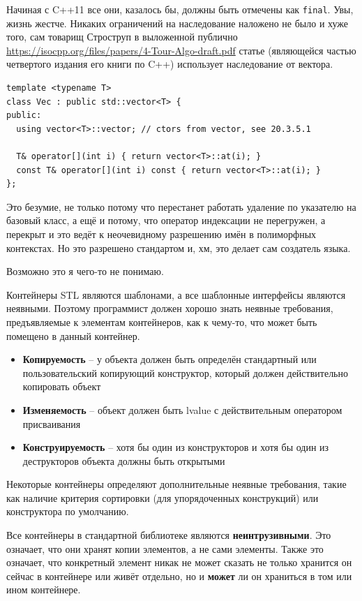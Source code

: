 \documentclass[a4paper,12pt,oneside]{book}
\begin{document}
Начиная с C++11 все они, казалось бы, должны быть отмечены как \lstinline!final!. Увы, жизнь жестче. Никаких ограничений на наследование наложено не было и хуже того, сам товарищ Строструп в выложенной публично \url{https://isocpp.org/files/papers/4-Tour-Algo-draft.pdf} статье (являющейся частью четвертого издания его книги по C++) использует наследование от вектора.

\begin{lstlisting}
template <typename T>
class Vec : public std::vector<T> {
public:
  using vector<T>::vector; // ctors from vector, see 20.3.5.1

  T& operator[](int i) { return vector<T>::at(i); }
  const T& operator[](int i) const { return vector<T>::at(i); }
};
\end{lstlisting}

Это безумие, не только потому что перестанет работать удаление по указателю на базовый класс, а ещё и потому, что оператор индексации не перегружен, а перекрыт и это ведёт к неочевидному разрешению имён в полиморфных контекстах. Но это разрешено стандартом и, хм, это делает сам создатель языка.

Возможно это я чего-то не понимаю.

Контейнеры STL являются шаблонами, а все шаблонные интерфейсы являются неявными. Поэтому программист должен хорошо знать неявные требования, предъявляемые к элементам контейнеров, как к чему-то, что может быть помещено в данный контейнер.

\begin{itemize}
\item \textbf{Копируемость} -- у объекта должен быть определён стандартный или пользовательский копирующий конструктор, который должен действительно копировать объект
\item \textbf{Изменяемость} -- объект должен быть lvalue с действительным оператором присваивания
\item \textbf{Конструируемость} -- хотя бы один из конструкторов и хотя бы один из деструкторов объекта должны быть открытыми
\end{itemize}

Некоторые контейнеры определяют дополнительные неявные требования, такие как наличие критерия сортировки (для упорядоченных конструкций) или конструктора по умолчанию.

Все контейнеры в стандартной библиотеке являются \textbf{неинтрузивными}. Это означает, что они хранят копии элементов, а не сами элементы. Также это означает, что конкретный элемент никак не может сказать не только хранится он сейчас в контейнере или живёт отдельно, но и \textbf{может} ли он храниться в том или ином контейнере.
\end{document}
